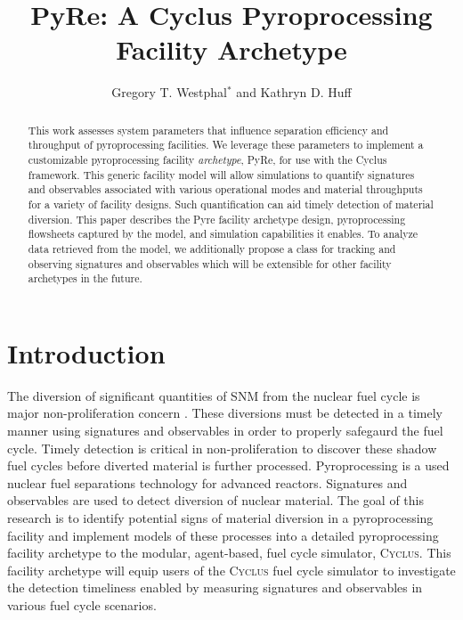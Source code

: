 \documentclass{anstrans}
\title{PyRe: A Cyclus Pyroprocessing Facility Archetype}
\author{Gregory T. Westphal$^*$ and Kathryn D. Huff}
\institute{
Dept. of Nuclear, Plasma and Radiological Engineering, University of Illinois at Urbana-Champaign \\
$^*$gtw2@illinois.edu
}
\newcommand{\Cyclus}{\textsc{Cyclus}\xspace}%
\begin{document}
\begin{abstract}
This work assesses system parameters that influence separation efficiency and 
throughput of pyroprocessing facilities. We leverage these parameters to implement a customizable pyroprocessing facility \emph{archetype}, PyRe, for use with the Cyclus framework.
This generic facility model will allow simulations to 
quantify signatures and observables associated with various operational modes 
and material throughputs for a variety of facility designs. Such quantification 
can aid timely detection of material diversion. 
This paper describes the Pyre facility archetype design, pyroprocessing flowsheets captured by the model, and simulation capabilities it enables. 
To analyze data retrieved from the model, we additionally propose a class for tracking and 
observing signatures and observables which will be extensible for other 
facility archetypes in the future.
\end{abstract}
\section{Introduction}
The diversion of significant quantities of SNM from the nuclear fuel cycle is major non-proliferation 
concern \cite{noauthor_iaea_2017}. These diversions must be detected in a timely manner using signatures and observables in 
order to properly safegaurd the fuel cycle. Timely detection is critical in non-proliferation to discover these shadow fuel cycles
before diverted material is further processed. Pyroprocessing is a used nuclear fuel separations technology for advanced reactors. 
Signatures and observables are used to detect diversion of nuclear material.
The goal of this research is to identify potential signs of material diversion in a pyroprocessing facility and implement models 
of these processes into a detailed pyroprocessing facility archetype to the modular, agent-based, fuel cycle simulator, \Cyclus \cite{huff_fundamental_2016}. This facility archetype will equip users of the \Cyclus fuel cycle simulator to investigate the 
detection timeliness enabled by measuring signatures and observables in various fuel cycle scenarios.
\end{document}
